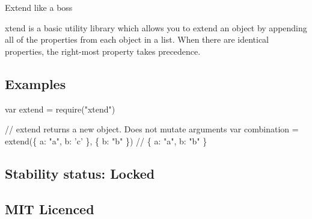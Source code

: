 \href{http://ci.testling.com/Raynos/xtend}{\tt }

\href{http://github.com/badges/stability-badges}{\tt }

Extend like a boss

xtend is a basic utility library which allows you to extend an object by appending all of the properties from each object in a list. When there are identical properties, the right-\/most property takes precedence.

\subsection*{Examples}


\begin{DoxyCode}
var extend = require("xtend")

// extend returns a new object. Does not mutate arguments
var combination = extend(\{
    a: "a",
    b: 'c'
\}, \{
    b: "b"
\})
// \{ a: "a", b: "b" \}
\end{DoxyCode}


\subsection*{Stability status\+: Locked}

\subsection*{M\+IT Licenced}